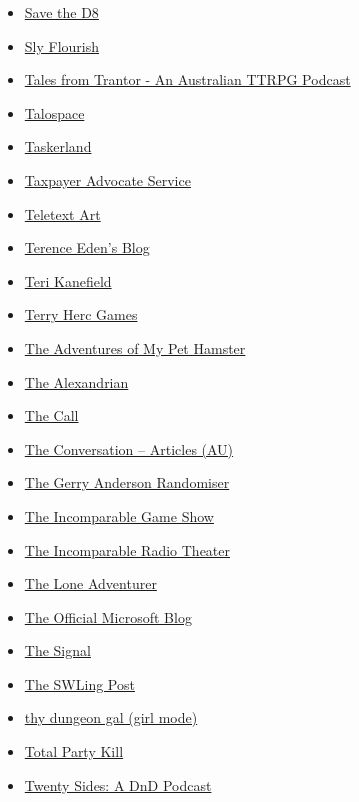 \begin{itemize}
\item
  \href{https://www.savethed8pod.com}{Save the D8}
\item
  \href{https://slyflourish.com/}{Sly Flourish}
\item
  \href{http://talesfromtrantor.com/}{Tales from Trantor - An Australian
  TTRPG Podcast}
\item
  \href{https://www.talospace.com/}{Talospace}
\item
  \href{https://tasker.land/}{Taskerland}
\item
  \href{https://www.taxpayeradvocate.irs.gov/}{Taxpayer Advocate
  Service}
\item
  \href{https://teletextart.co.uk/}{Teletext Art}
\item
  \href{https://shkspr.mobi/blog}{Terence Eden's Blog}
\item
  \href{https://terikanefield.com/}{Teri Kanefield}
\item
  \href{https://www.terryhercgames.com/}{Terry Herc Games}
\item
  \href{https://steve.cooleysekula.net/blog}{The Adventures of My Pet
  Hamster}
\item
  \href{https://thealexandrian.net/}{The Alexandrian}
\item
  \href{http://thecallpodcast.libsyn.com/website}{The Call}
\item
  \href{https://theconversation.com/}{The Conversation -- Articles (AU)}
\item
  \href{https://gerry-anderson-randomiser.captivate.fm}{The Gerry
  Anderson Randomiser}
\item
  \href{https://www.theincomparable.com/gameshow/}{The Incomparable Game
  Show}
\item
  \href{https://www.theincomparable.com/radio/}{The Incomparable Radio
  Theater}
\item
  \href{https://theloneadventurer.podbean.com/}{The Lone Adventurer}
\item
  \href{https://blogs.microsoft.com/}{The Official Microsoft Blog}
\item
  \href{https://blogs.loc.gov/thesignal}{The Signal}
\item
  \href{https://swling.com/blog}{The SWLing Post}
\item
  \href{https://thydungeongal.tumblr.com/}{thy dungeon gal (girl mode)}
\item
  \href{https://www.theincomparable.com/tpk/}{Total Party Kill}
\item
  \href{https://www.buzzsprout.com/2016568}{Twenty Sides: A DnD Podcast}

\end{itemize}
